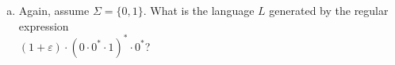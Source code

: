 \begin{enumerate}[(a)]
\item Again, assume \( \Sigma = \{0,1\} \). What is the language \( L \) generated by the regular expression 
      \\[0.2cm]
      \hspace*{1.3cm}
      $(1 + \varepsilon)\cdot(0\cdot 0^* \cdot 1)^* \cdot 0^*$? \eox

\end{enumerate}

